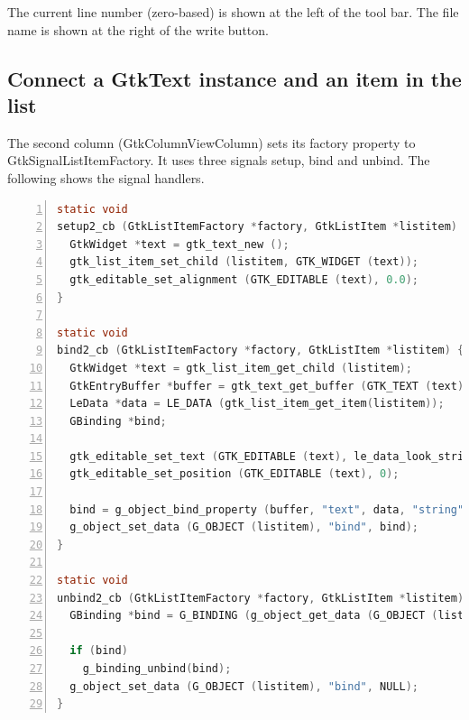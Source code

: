The current line number (zero-based) is shown at the left of the tool
bar. The file name is shown at the right of the write button.

\subsection{Connect a GtkText instance and an item in the
list}\label{connect-a-gtktext-instance-and-an-item-in-the-list}

The second column (GtkColumnViewColumn) sets its factory property to
GtkSignalListItemFactory. It uses three signals setup, bind and unbind.
The following shows the signal handlers.

\begin{lstlisting}[language=C, numbers=left]
static void
setup2_cb (GtkListItemFactory *factory, GtkListItem *listitem) {
  GtkWidget *text = gtk_text_new ();
  gtk_list_item_set_child (listitem, GTK_WIDGET (text));
  gtk_editable_set_alignment (GTK_EDITABLE (text), 0.0);
}

static void
bind2_cb (GtkListItemFactory *factory, GtkListItem *listitem) {
  GtkWidget *text = gtk_list_item_get_child (listitem);
  GtkEntryBuffer *buffer = gtk_text_get_buffer (GTK_TEXT (text));
  LeData *data = LE_DATA (gtk_list_item_get_item(listitem));
  GBinding *bind;

  gtk_editable_set_text (GTK_EDITABLE (text), le_data_look_string (data));
  gtk_editable_set_position (GTK_EDITABLE (text), 0);

  bind = g_object_bind_property (buffer, "text", data, "string", G_BINDING_DEFAULT);
  g_object_set_data (G_OBJECT (listitem), "bind", bind);
}

static void
unbind2_cb (GtkListItemFactory *factory, GtkListItem *listitem) {
  GBinding *bind = G_BINDING (g_object_get_data (G_OBJECT (listitem), "bind"));

  if (bind)
    g_binding_unbind(bind);
  g_object_set_data (G_OBJECT (listitem), "bind", NULL);
}
\end{lstlisting}

